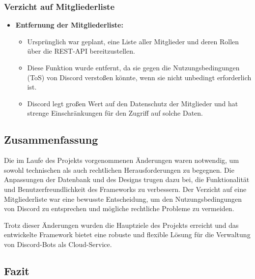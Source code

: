 \subsubsection*{Verzicht auf Mitgliederliste}

\begin{itemize}
    \item \textbf{Entfernung der Mitgliederliste:}
    \begin{itemize}
        \item Ursprünglich war geplant, eine Liste aller Mitglieder und deren Rollen über die REST-API bereitzustellen.
        \item Diese Funktion wurde entfernt, da sie gegen die Nutzungsbedingungen (ToS) von Discord verstoßen könnte, wenn sie nicht unbedingt erforderlich ist.
        \item Discord legt großen Wert auf den Datenschutz der Mitglieder und hat strenge Einschränkungen für den Zugriff auf solche Daten.
    \end{itemize}
\end{itemize}

\subsection*{Zusammenfassung}

Die im Laufe des Projekts vorgenommenen Änderungen waren notwendig, um sowohl technischen als auch rechtlichen Herausforderungen zu begegnen. Die Anpassungen der Datenbank und des Designs trugen dazu bei, die Funktionalität und Benutzerfreundlichkeit des Frameworks zu verbessern. Der Verzicht auf eine Mitgliederliste war eine bewusste Entscheidung, um den Nutzungsbedingungen von Discord zu entsprechen und mögliche rechtliche Probleme zu vermeiden.

Trotz dieser Änderungen wurden die Hauptziele des Projekts erreicht und das entwickelte Framework bietet eine robuste und flexible Lösung für die Verwaltung von Discord-Bots als Cloud-Service.

\subsection{Fazit}\label{fazit}


